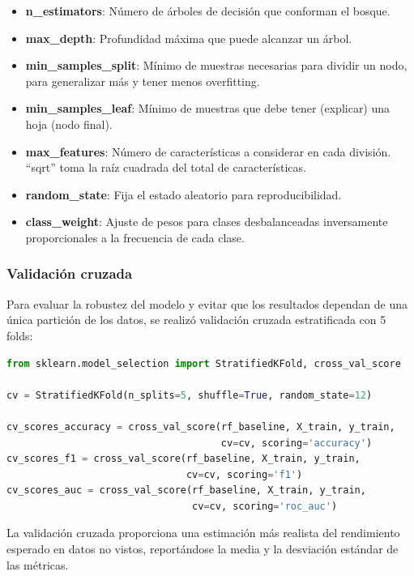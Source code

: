 \begin{itemize}
	\item \textbf{n_estimators}: Número de árboles de decisión que conforman el bosque.
	\item \textbf{max_depth}: Profundidad máxima que puede alcanzar un árbol.
	\item \textbf{min_samples_split}: Mínimo de muestras necesarias para dividir un nodo, para generalizar más y tener menos overfitting.
	\item \textbf{min_samples_leaf}: Mínimo de muestras que debe tener (explicar) una hoja (nodo final).
	\item \textbf{max_features}: Número de características a considerar en cada división. ``sqrt'' toma la raíz cuadrada del total de características.
	\item \textbf{random_state}: Fija el estado aleatorio para reproducibilidad.
	\item \textbf{class_weight}: Ajuste de pesos para clases desbalanceadas inversamente proporcionales a la frecuencia de cada clase.
\end{itemize}

\subsubsection*{Validación cruzada}

Para evaluar la robustez del modelo y evitar que los resultados dependan de una única partición de los datos, se realizó validación cruzada estratificada con 5 folds:

 \begin{lstlisting}[language=Python, caption=Validación cruzada con Random Forest]
from sklearn.model_selection import StratifiedKFold, cross_val_score

cv = StratifiedKFold(n_splits=5, shuffle=True, random_state=12)

cv_scores_accuracy = cross_val_score(rf_baseline, X_train, y_train, 
                                     cv=cv, scoring='accuracy')
cv_scores_f1 = cross_val_score(rf_baseline, X_train, y_train, 
                               cv=cv, scoring='f1')
cv_scores_auc = cross_val_score(rf_baseline, X_train, y_train, 
                                cv=cv, scoring='roc_auc')
\end{lstlisting}

La validación cruzada proporciona una estimación más realista del rendimiento esperado en datos no vistos, reportándose la media y la desviación estándar de las métricas.

